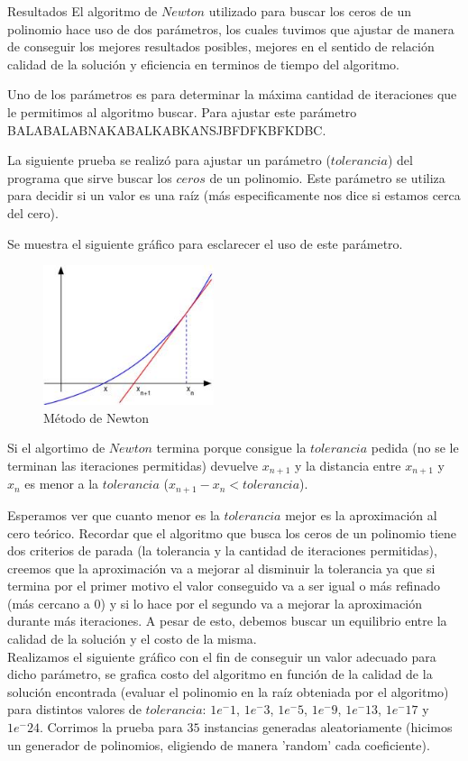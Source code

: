 \begin{section}{Resultados}
	El algoritmo de $Newton$ utilizado para buscar los ceros de un polinomio hace uso de dos parámetros, los cuales tuvimos que ajustar de manera de conseguir los mejores resultados posibles, mejores en el sentido de relación calidad de la solución y eficiencia en terminos de tiempo del algoritmo.
	
	Uno de los parámetros es para determinar la máxima cantidad de iteraciones que le permitimos al algoritmo buscar. Para ajustar este parámetro BALABALABNAKABALKABKANSJBFDFKBFKDBC.

	La siguiente prueba se realizó para ajustar un parámetro ($tolerancia$) del programa que sirve buscar los $ceros$ de un polinomio. Este parámetro se utiliza para decidir si un valor es una raíz (más especificamente nos dice si estamos cerca del cero).
	
	Se muestra el siguiente gráfico para esclarecer el uso de este parámetro.
	
	\begin{figure}[H]
	  \centering
		\includegraphics[width=5cm]{graficos/newton.jpg}
	  \caption{Método de Newton}
	  \label{fig:newton}
	\end{figure}
	
	Si el algortimo de $Newton$ termina porque consigue la $tolerancia$ pedida (no se le terminan las iteraciones permitidas) devuelve $x_{n+1}$ y la distancia entre $x_{n+1}$ y $x_n$ es menor a la $tolerancia$ ($x_{n+1} - x_n < tolerancia$).
	
	Esperamos ver que cuanto menor es la $tolerancia$ mejor es la aproximación al cero teórico. Recordar que el algoritmo que busca los ceros de un polinomio tiene dos criterios de parada (la tolerancia y la cantidad de iteraciones permitidas), creemos que la aproximación va a mejorar al disminuir la tolerancia ya que si termina por el primer motivo el valor conseguido va a ser igual o más refinado (más cercano a 0) y si lo hace por el segundo va a mejorar la aproximación durante más iteraciones. A pesar de esto, debemos buscar un equilibrio entre la calidad de la solución y el costo de la misma.\\
	Realizamos el siguiente gráfico con el fin de conseguir un valor adecuado para dicho parámetro, se grafica costo del algoritmo en función de la calidad de la solución encontrada (evaluar el polinomio en la raíz obteniada por el algoritmo) para distintos valores de $tolerancia$: $1e^-1$, $1e^-3$, $1e^-5$, $1e^-9$, $1e^-13$, $1e^-17$ y $1e^-24$. Corrimos la prueba para $35$ instancias generadas aleatoriamente (hicimos un generador de polinomios, eligiendo de manera 'random' cada coeficiente).
	

\end{section}
